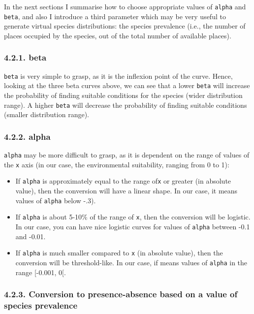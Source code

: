 \documentclass[]{article}
\providecommand{\tightlist}{%
  \setlength{\itemsep}{0pt}\setlength{\parskip}{0pt}}
\begin{document}
In the next sections I summarise how to choose appropriate values of
\texttt{alpha} and \texttt{beta}, and also I introduce a third parameter
which may be very useful to generate virtual species distributions: the
species prevalence (i.e., the number of places occupied by the species,
out of the total number of available places).

\subsubsection{4.2.1. beta}\label{beta}

\texttt{beta} is very simple to grasp, as it is the inflexion point of
the curve. Hence, looking at the three beta curves above, we can see
that a lower \texttt{beta} will increase the probability of finding
suitable conditions for the species (wider distribution range). A higher
\texttt{beta} will decrease the probability of finding suitable
conditions (smaller distribution range).

\subsubsection{4.2.2. alpha}\label{alpha}

\texttt{alpha} may be more difficult to grasp, as it is dependent on the
range of values of the \texttt{x} axis (in our case, the environmental
suitability, ranging from 0 to 1):

\begin{itemize}
\tightlist
\item
  If \texttt{alpha} is approximately equal to the range of\texttt{x} or
  greater (in absolute value), then the conversion will have a linear
  shape. In our case, it means values of \texttt{alpha} below -.3).
\item
  If \texttt{alpha} is about 5-10\% of the range of \texttt{x}, then the
  conversion will be logistic. In our case, you can have nice logistic
  curves for values of \texttt{alpha} between -0.1 and -0.01.
\item
  If \texttt{alpha} is much smaller compared to \texttt{x} (in absolute
  value), then the conversion will be threshold-like. In our case, if
  means values of \texttt{alpha} in the range {[}-0.001, 0{[}.
\end{itemize}

\hypertarget{conversion-to-presence-absence-based-on-a-value-of-species-prevalence}{\subsubsection{4.2.3.
Conversion to presence-absence based on a value of species
prevalence}\label{conversion-to-presence-absence-based-on-a-value-of-species-prevalence}}
\end{document}
